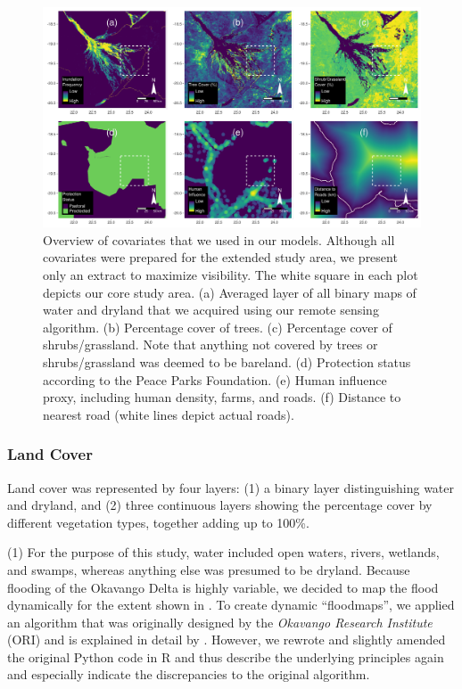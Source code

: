 \documentclass[abstract=on,10pt,a4paper,bibliography=totocnumbered]{scrartcl}
\begin{document}
\begin{figure}[h]
  \begin{center}
    \includegraphics[width = \textwidth]{99_Covariates.pdf}
    \caption{Overview of covariates that we used in our models. Although all
    covariates were prepared for the extended study area, we present only an
    extract to maximize visibility. The white square in each plot depicts our
    core study area. (a) Averaged layer of all binary maps of water and dryland
    that we acquired using our remote sensing algorithm. (b) Percentage cover of
    trees. (c) Percentage cover of shrubs/grassland. Note that anything not
    covered by trees or shrubs/grassland was deemed to be bareland. (d)
    Protection status according to the Peace Parks Foundation. (e) Human
    influence proxy, including human density, farms, and roads. (f) Distance to
    nearest road (white lines depict actual roads).}
    \label{Covariates}
  \end{center}
\end{figure}

\subsubsection{Land Cover}
Land cover was represented by four layers: (1) a binary layer distinguishing
water and dryland, and (2) three continuous layers showing the percentage cover
by different vegetation types, together adding up to 100\%.

(1) For the purpose of this study, water included open waters, rivers, wetlands,
and swamps, whereas anything else was presumed to be dryland. Because flooding
of the Okavango Delta is highly variable, we decided to map the flood
dynamically for the extent shown in . To create dynamic
``floodmaps'', we applied an algorithm that was originally designed by the
\textit{Okavango Research Institute} (ORI) and is explained in detail by
\cite{Wolski.2017}. However, we rewrote and slightly amended the original Python
code in R and thus describe the underlying principles again and especially
indicate the discrepancies to the original algorithm.
\end{document}
